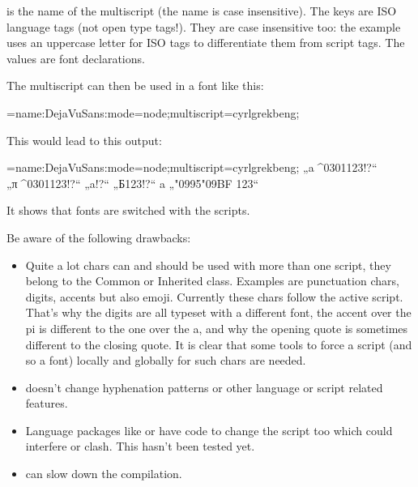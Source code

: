   \beginlisting
   \endlisting

   is the name of the multiscript (the name is case insensitive). The keys are ISO language tags (not open type tags!).  They are case insensitive too: the example uses an uppercase letter for ISO tags to differentiate them from script tags.  The values are font declarations.

  The multiscript can then be used in a font like this:

  \beginlisting
   \font\test={name:DejaVuSans:mode=node;multiscript=cyrlgrekbeng;}
  \endlisting

  This would lead to this output:

  {\Large \font\test={name:DejaVuSans:mode=node;multiscript=cyrlgrekbeng;}\test
   „a^^^^0301123!?“  „π^^^^0301123!?“ „a!?“  „Б123!?“ a „\char"0995\char"09BF 123“
  }

  It shows that fonts are switched with the scripts.

  Be aware of the following drawbacks:

  \begin{itemize}
  \item Quite a lot chars can and should be used with more than one script, they belong to the Common or Inherited class. Examples are punctuation chars, digits, accents but also emoji. Currently these chars follow the active script. That's why the digits are all typeset with a different font, the accent over the pi is different to the one over the a, and why the opening quote is sometimes different to the closing quote. It is clear that some tools to force a script (and so a font) locally and globally for such chars are needed.

  \item {} doesn't change hyphenation patterns or other language or script related features.

  \item Language packages like  or  have code to change the script too which could interfere or clash. This hasn't been tested yet.

  \item {} can slow down the compilation.
  \end{itemize}

